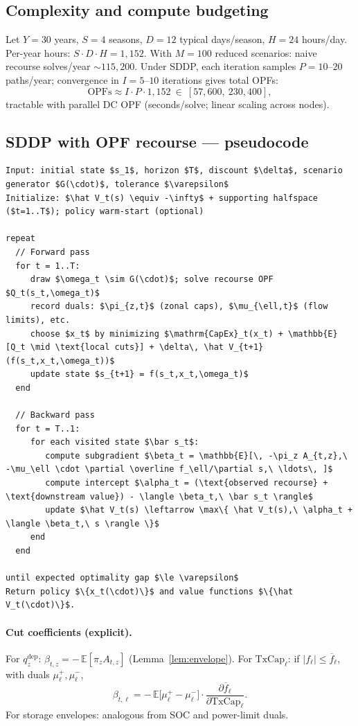 \documentclass[11pt]{article}
\newcommand{\E}{\mathbb{E}}
\numberwithin{equation}{section}
\theoremstyle{definition}
\theoremstyle{remark}
\begin{document}
\subsection{ Complexity and compute budgeting}

Let $Y=30$ years, $S=4$ seasons, $D=12$ typical days/season, $H=24$ hours/day. Per-year hours: $S\cdot D\cdot H=1{,}152$. With $M=100$ reduced scenarios: naive recourse solves/year $\sim 115{,}200$. Under SDDP, each iteration samples $P=10$--$20$ paths/year; convergence in $I=5$--$10$ iterations gives total OPFs:
\[
\text{OPFs} \approx I\cdot P \cdot 1{,}152 \ \in\ [57{,}600,\ 230{,}400],
\]
tractable with parallel DC OPF (seconds/solve; linear scaling across nodes).

\subsection{ SDDP with OPF recourse — pseudocode}

\begin{lstlisting}[style=annexpseudo,caption={SDDP with OPF recourse},label={lst:sddp}]
Input: initial state $s_1$, horizon $T$, discount $\delta$, scenario generator $G(\cdot)$, tolerance $\varepsilon$
Initialize: $\hat V_t(s) \equiv -\infty$ + supporting halfspace ($t=1..T$); policy warm-start (optional)

repeat
  // Forward pass
  for t = 1..T:
     draw $\omega_t \sim G(\cdot)$; solve recourse OPF $Q_t(s_t,\omega_t)$
     record duals: $\pi_{z,t}$ (zonal caps), $\mu_{\ell,t}$ (flow limits), etc.
     choose $x_t$ by minimizing $\mathrm{CapEx}_t(x_t) + \mathbb{E}[Q_t \mid \text{local cuts}] + \delta\, \hat V_{t+1}(f(s_t,x_t,\omega_t))$
     update state $s_{t+1} = f(s_t,x_t,\omega_t)$
  end

  // Backward pass
  for t = T..1:
     for each visited state $\bar s_t$:
        compute subgradient $\beta_t = \mathbb{E}[\, -\pi_z A_{t,z},\ -\mu_\ell \cdot \partial \overline f_\ell/\partial s,\ \ldots\, ]$
        compute intercept $\alpha_t = (\text{observed recourse} + \text{downstream value}) - \langle \beta_t,\ \bar s_t \rangle$
        update $\hat V_t(s) \leftarrow \max\{ \hat V_t(s),\ \alpha_t + \langle \beta_t,\ s \rangle \}$
     end
  end

until expected optimality gap $\le \varepsilon$
Return policy $\{x_t(\cdot)\}$ and value functions $\{\hat V_t(\cdot)\}$.
\end{lstlisting}

\paragraph{Cut coefficients (explicit).}
For $q^{\mathrm{dep}}_{z}$: $\beta_{t,z} = -\,\E[\pi_{z} A_{t,z}]$ (Lemma~\ref{lem:envelope}).
For $\mathrm{TxCap}_{\ell}$: if $|f_\ell|\le \overline f_\ell$, with duals $\mu_\ell^{+},\mu_\ell^{-}$,
\[
\beta_{t,\ell} = -\,\E\big[\mu_\ell^{+} - \mu_\ell^{-}\big]\cdot \frac{\partial \overline f_\ell}{\partial \mathrm{TxCap}_\ell}.
\]
For storage envelopes: analogous from SOC and power-limit duals.
\end{document}
